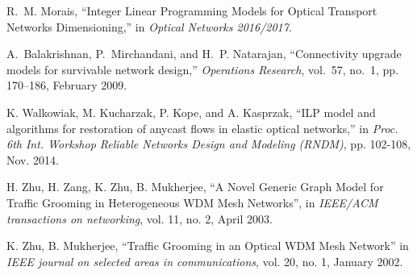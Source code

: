 \begin{thebibliography}{10}
R.~M. Morais, ``Integer Linear Programming Models for Optical Transport Networks Dimensioning,'' in \emph{Optical Networks 2016/2017}.

\BIBentryALTinterwordspacing
A.~Balakrishnan, P.~Mirchandani, and H.~P. Natarajan, ``Connectivity upgrade models for survivable network design,'' \emph{Operations Research}, vol.~57, no.~1, pp. 170--186, February 2009.

K. Walkowiak, M. Kucharzak, P. Kope, and A. Kasprzak, ``ILP model and algorithms for restoration of anycast flows in elastic optical networks,'' in \emph{Proc. 6th Int. Workshop Reliable Networks Design and Modeling (RNDM)}, pp. 102-108, Nov. 2014.

H. Zhu, H. Zang, K. Zhu, B. Mukherjee, ``A Novel Generic Graph Model for Traffic Grooming in Heterogeneous WDM Mesh Networks'', in \emph{IEEE/ACM transactions on networking}, vol. 11, no. 2, April 2003.

K. Zhu, B. Mukherjee, ``Traffic Grooming in an Optical WDM Mesh Network'' in \emph{IEEE journal on selected areas in communications}, vol. 20, no. 1, January 2002.

\end{thebibliography}
